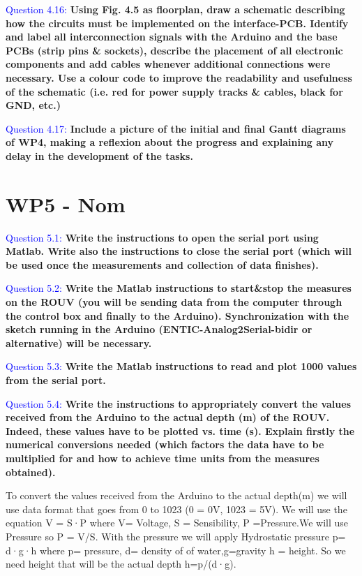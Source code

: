 \documentclass[12pt, a4papre]{article}
\begin{document}
	

	\textcolor{blue}{Question 4.16:} \textbf{Using Fig. 4.5 as floorplan, draw a schematic describing how the circuits must be implemented on the interface-PCB. Identify and label all interconnection signals with the Arduino and the base PCBs (strip pins \& sockets), describe the placement of all electronic components and add cables whenever additional connections were necessary. Use a colour code to improve the readability and usefulness of the schematic (i.e. red for power supply tracks \& cables, black for GND, etc.)}

	\textcolor{blue}{Question 4.17:} \textbf{Include a picture of the initial and final Gantt diagrams of WP4, making a reflexion about the progress and explaining any delay in the development of the tasks.}
	
	\newpage
	
	\section{WP5 - Nom}
	\textcolor{blue}{Question 5.1:} \textbf{Write the instructions to open the serial port using Matlab. Write also the instructions to close the serial port (which will be used once the measurements and collection of data finishes).}
	
	
		 
	\textcolor{blue}{Question 5.2:} \textbf{Write the Matlab instructions to start\&stop the measures on the ROUV (you will be sending data from the computer through the control box and finally to the Arduino). Synchronization with the sketch running in the Arduino (ENTIC-Analog2Serial-bidir or alternative) will be necessary.}
	
	
	
	\textcolor{blue}{Question 5.3:} \textbf{Write the Matlab instructions to read and plot 1000 values from the serial port. }
	
		
		
	\textcolor{blue}{Question 5.4:} \textbf{Write the instructions to appropriately convert the values received from the Arduino to the actual depth (m) of the ROUV. Indeed, these values have to be plotted vs. time (s). Explain firstly the numerical conversions needed (which factors the data have to be multiplied for and how to achieve time units from the measures obtained).}
	
	To convert the values received from the Arduino to the actual depth(m) we will use data format that goes from 0 to 1023 (0 = 0V, 1023 = 5V). We will use the equation V = S·P where V= Voltage, S = Sensibility, P =Pressure.We will use Pressure so P = V/S. With the pressure we will apply Hydrostatic pressure p= d·g·h where p= pressure, d= density of of water,g=gravity  h = height. So we need height that will be the actual depth h=p/(d·g).
	
\end{document}
